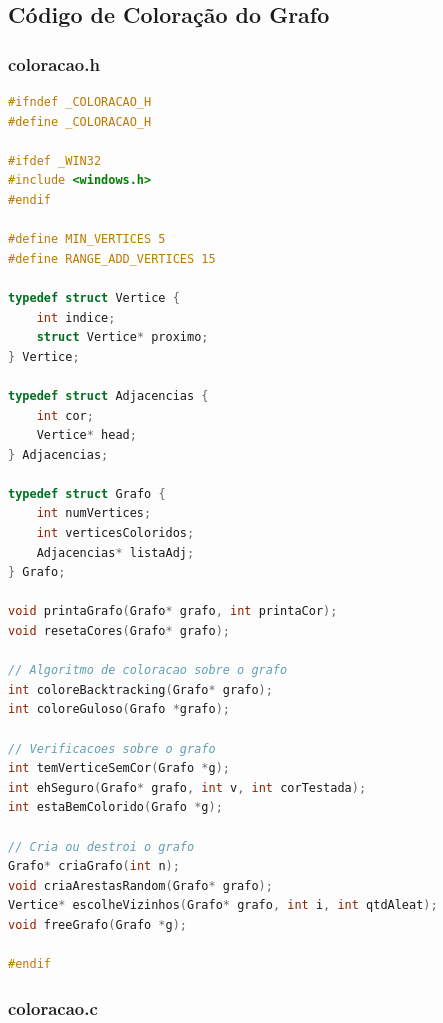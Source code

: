 \documentclass{article}
\begin{document}
\subsection{Código de Coloração do Grafo}

\subsubsection{coloracao.h}

\vspace{0.5em}
\begin{adjustwidth}{}{}
\begin{lstlisting}[language=C]
#ifndef _COLORACAO_H
#define _COLORACAO_H

#ifdef _WIN32
#include <windows.h>
#endif

#define MIN_VERTICES 5
#define RANGE_ADD_VERTICES 15

typedef struct Vertice {
	int indice;
	struct Vertice* proximo;
} Vertice;

typedef struct Adjacencias {
	int cor;
	Vertice* head;
} Adjacencias;

typedef struct Grafo {
	int numVertices;
	int verticesColoridos;
	Adjacencias* listaAdj;
} Grafo;

void printaGrafo(Grafo* grafo, int printaCor);
void resetaCores(Grafo* grafo);

// Algoritmo de coloracao sobre o grafo
int coloreBacktracking(Grafo* grafo);
int coloreGuloso(Grafo *grafo);

// Verificacoes sobre o grafo
int temVerticeSemCor(Grafo *g);
int ehSeguro(Grafo* grafo, int v, int corTestada);
int estaBemColorido(Grafo *g);

// Cria ou destroi o grafo
Grafo* criaGrafo(int n);
void criaArestasRandom(Grafo* grafo);
Vertice* escolheVizinhos(Grafo* grafo, int i, int qtdAleat);
void freeGrafo(Grafo *g);

#endif
\end{lstlisting}
\end{adjustwidth}
\vspace{0.5em}

\subsubsection{coloracao.c}
\end{document}
